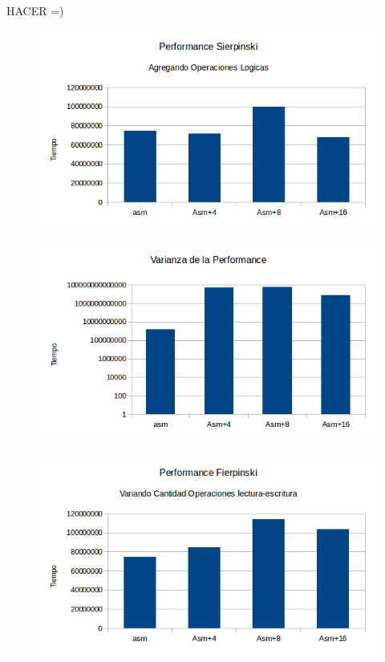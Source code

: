 \documentclass[a4paper]{article}
\begin{document}
HACER =)

\begin{figure}[h!]
  \begin{center}
  \includegraphics[scale=0.66]{Graficos1.5/sie/addsub/per.png}
  \label{nombreparareferenciar1}
  \end{center}
\end{figure}

\begin{figure}[h!]
  \begin{center}
  \includegraphics[scale=0.66]{Graficos1.5/ban/addsub/var.png}
  \label{nombreparareferenciar1}
  \end{center}
\end{figure}


\begin{figure}[h!]
  \begin{center}
  \includegraphics[scale=0.66]{Graficos1.5/sie/pushpop/per.png}
  \label{nombreparareferenciar1}
  \end{center}
\end{figure}
\end{document}
